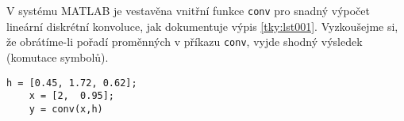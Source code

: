 \begin{mdframed}[style=mdexam]
\begin{example}
    {\centering
      \captionsetup{type=figure}
      \label{tky:fig011}
    \par}

    V systému \textsc{MATLAB} je vestavěna vnitřní funkce \lstinline[style=luaMatlabText]!conv! pro
    snadný výpočet lineární diskrétní konvoluce, jak dokumentuje výpis \ref{tky:lst001}. Vyzkoušejme
    si, že obrátíme-li pořadí proměnných v příkazu \lstinline[style=luaMatlabText]!conv!, vyjde
    shodný výsledek (komutace symbolů).
  \end{example} 
  \begin{lstlisting}[style=luaMatlabText,gobble=4, label={tky:lst001}]
    h = [0.45, 1.72, 0.62];
    x = [2,  0.95];
    y = conv(x,h)
  \end{lstlisting}

\end{mdframed}